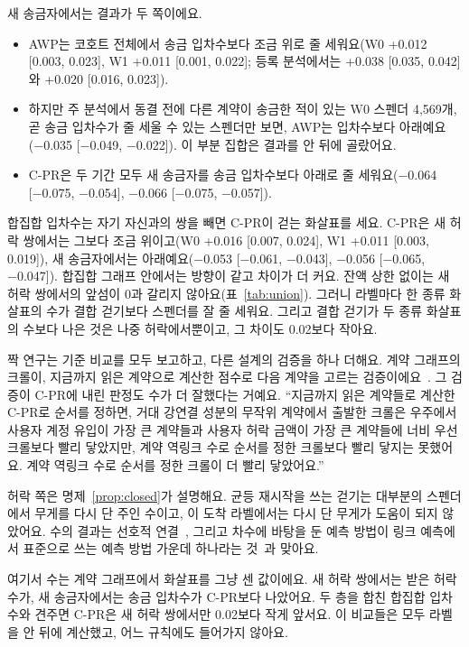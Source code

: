 새 송금자에서는 결과가 두 쪽이에요.
\begin{itemize}
\item AWP는 코호트 전체에서 송금 입차수보다 조금 위로 줄 세워요(W0 +0.012 [0.003, 0.023], W1 +0.011 [0.001, 0.022]; 등록 분석에서는 +0.038 [0.035, 0.042]와 +0.020 [0.016, 0.023]).
\item 하지만 주 분석에서 동결 전에 다른 계약이 송금한 적이 있는 W0 스펜더 4,569개, 곧 송금 입차수가 줄 세울 수 있는 스펜더만 보면, AWP는 입차수보다 아래예요(−0.035 [−0.049, −0.022]). 이 부분 집합은 결과를 안 뒤에 골랐어요.
\item C-PR은 두 기간 모두 새 송금자를 송금 입차수보다 아래로 줄 세워요(−0.064 [−0.075, −0.054], −0.066 [−0.075, −0.057]).
\end{itemize}

합집합 입차수는 자기 자신과의 쌍을 빼면 C-PR이 걷는 화살표를 세요. C-PR은 새 허락 쌍에서는 그보다 조금 위이고(W0 +0.016 [0.007, 0.024], W1 +0.011 [0.003, 0.019]), 새 송금자에서는 아래예요(−0.053 [−0.061, −0.043], −0.056 [−0.065, −0.047]). 합집합 그래프 안에서는 방향이 같고 차이가 더 커요. 잔액 상한 없이는 새 허락 쌍에서의 앞섬이 0과 갈리지 않아요(표~\ref{tab:union}). 그러니 라벨마다 한 종류 화살표의 수가 결합 걷기보다 스펜더를 잘 줄 세워요. 그리고 결합 걷기가 두 종류 화살표의 수보다 나은 것은 나중 허락에서뿐이고, 그 차이도 0.02보다 작아요.

짝 연구는 기준 비교를 모두 보고하고, 다른 설계의 검증을 하나 더해요. 계약 그래프의 크롤이, 지금까지 읽은 계약으로 계산한 점수로 다음 계약을 고르는 검증이에요~\cite{kwon2026companion}. 그 검증이 C-PR에 내린 판정도 수가 더 잘했다는 거예요. “지금까지 읽은 계약들로 계산한 C-PR로 순서를 정하면, 거대 강연결 성분의 무작위 계약에서 출발한 크롤은 우주에서 사용자 계정 유입이 가장 큰 계약들과 사용자 허락 금액이 가장 큰 계약들에 너비 우선 크롤보다 빨리 닿았지만, 계약 역링크 수로 순서를 정한 크롤보다 빨리 닿지는 못했어요. 계약 역링크 수로 순서를 정한 크롤이 더 빨리 닿았어요.”

허락 쪽은 명제~\ref{prop:closed}가 설명해요. 균등 재시작을 쓰는 걷기는 대부분의 스펜더에서 무게를 다시 단 주인 수이고, 이 도착 라벨에서는 다시 단 무게가 도움이 되지 않았어요. 수의 결과는 선호적 연결~\cite{barabasi1999scaling,newman2001clustering}, 그리고 차수에 바탕을 둔 예측 방법이 링크 예측에서 표준으로 쓰는 예측 방법 가운데 하나라는 것~\cite{libennowell2007link}과 맞아요.

\begin{puri}
여기서 수는 계약 그래프에서 화살표를 그냥 센 값이에요. 새 허락 쌍에서는 받은 허락 수가, 새 송금자에서는 송금 입차수가 C-PR보다 나았어요. 두 층을 합친 합집합 입차수와 견주면 C-PR은 새 허락 쌍에서만 0.02보다 작게 앞서요. 이 비교들은 모두 라벨을 안 뒤에 계산했고, 어느 규칙에도 들어가지 않아요.
\end{puri}

